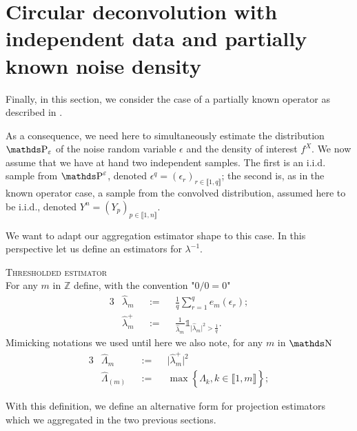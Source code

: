 \section{Circular deconvolution with independent data and partially known noise density}\label{FREQ_CIRCDECONV_UNKNOWN_IID}

Finally, in this section, we consider the case of a partially known operator as described in .

As a consequence, we need here to simultaneously estimate the distribution $\P_{\epsilon}$ of the noise random variable $\epsilon$ and the density of interest $f^{X}$.
We now assume that we have at hand two independent samples.
The first is an i.i.d. sample from $\P^{\epsilon}$, denoted $\epsilon^{q} = \left(\epsilon_{r}\right)_{r \in \llbracket 1, q \rrbracket}$; the second is, as in the known operator case, a sample from the convolved distribution, assumed here to be i.i.d., denoted $Y^{n} = \left(Y_{p}\right)_{p \in \llbracket 1, n \rrbracket}$.

\medskip

We want to adapt our aggregation estimator shape to this case. In this perspective let us define an estimators for $\lambda^{-1}$.

\begin{de}{\textsc{Thresholded estimator} \\}\label{DE_FREQ_CIRCDECONV_UNKNOWN_IID_THRESHOLDEDEST}
For any $m$ in $\mathds{Z}$ define, with the convention "$0/0 = 0$"
\begin{alignat*}{3}
& \widehat{\lambda}_{m} && := && \frac{1}{q} \sum\limits_{r = 1}^{q} e_{m}(\epsilon_{r});\\
& \widehat{\lambda}^{+}_{m} && := && \frac{1}{\widehat{\lambda}_{m}} \mathds{1}_{\vert \widehat{\lambda}_{m}\vert^{2} > \frac{1}{q}}.
\end{alignat*}
Mimicking notations we used until here we also note, for any $m$ in $\N$
\begin{alignat*}{3}
& \widehat{\Lambda}_{m} && := && \vert \widehat{\lambda}^{+}_{m} \vert^{2}\\
& \widehat{\Lambda}_{(m)} && := && \max\left\{\widehat{\Lambda}_{k}, k \in \llbracket 1, m \rrbracket \right\};
\end{alignat*}
\end{de}

With this definition, we define an alternative form for projection estimators which we aggregated in the two previous sections.


